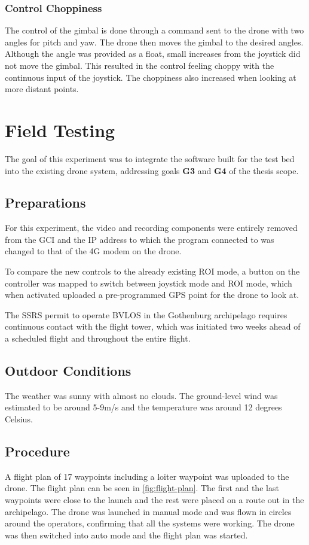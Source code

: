 \documentclass[nofilelist]{cslthse-msc}
\begin{document}
\subsubsection{Control Choppiness}
\label{sec:control-choppiness}
The control of the gimbal is done through a command sent to the drone with two angles for pitch and yaw. The drone then moves the gimbal to the desired angles. Although the angle was provided as a float, small increases from the joystick did not move the gimbal. This resulted in the control feeling choppy with the continuous input of the joystick. The choppiness also increased when looking at more distant points. 

\section{Field Testing}
The goal of this experiment was to integrate the software built for the test bed into the existing drone system, addressing goals \textbf{G3} and \textbf{G4} of the thesis scope. 

\subsection{Preparations}
For this experiment, the video and recording components were entirely removed from the GCI and the IP address to which the program connected to was changed to that of the 4G modem on the drone.

To compare the new controls to the already existing ROI mode, a button on the controller was mapped to switch between joystick mode and ROI mode, which when activated uploaded a pre-programmed GPS point for the drone to look at.

The SSRS permit to operate BVLOS in the Gothenburg archipelago requires continuous contact with the flight tower, which was initiated two weeks ahead of a scheduled flight and throughout the entire flight.

\subsection{Outdoor Conditions}
The weather was sunny with almost no clouds. The ground-level wind was estimated to be around 5-9m/s and the temperature was around 12 degrees Celsius.

\subsection{Procedure}
A flight plan of 17 waypoints including a loiter waypoint was uploaded to the drone. The flight plan can be seen in \ref{fig:flight-plan}. The first and the last waypoints were close to the launch and the rest were placed on a route out in the archipelago. The drone was launched in manual mode and was flown in circles around the operators, confirming that all the systems were working. The drone was then switched into auto mode and the flight plan was started.
\end{document}
